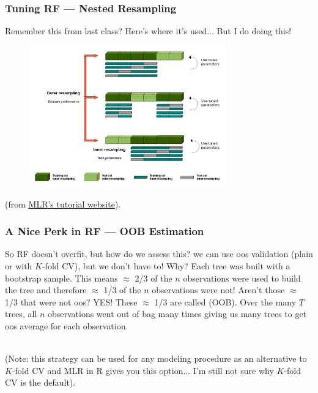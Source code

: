 \documentclass[handout]{beamer}
\begin{document}
\begin{frame}\frametitle{Tuning RF --- Nested Resampling}

Remember this from last class? Here's where it's used... But I do  doing this!

\begin{figure}
\centering
\includegraphics[width=3.36in]{nested_resampling_for_tuning.png}
\end{figure}

(from \href{https://mlr-org.github.io/mlr-tutorial/devel/html/nested_resampling/index.html}{MLR's tutorial website}).
\end{frame}

\begin{frame}\frametitle{A Nice Perk in RF --- OOB Estimation}

So RF doesn't overfit, but how do we assess this? \pause we can use oos validation (plain or with $K$-fold CV), but we don't have to! Why? \pause Each tree was built with a bootstrap sample. This means $\approx$ 2/3 of the $n$ observations were used to build the tree and therefore $\approx$ 1/3 of the $n$ observations were not! Aren't those $\approx$ 1/3 that were not oos? \pause YES! \pause These $\approx$ 1/3 are called  (OOB). Over the many $T$ trees, all $n$ observations went out of bag many times giving us many trees to get oos average for each observation. \\~\\ \pause


\tiny
(Note: this strategy can be used for any modeling procedure as an alternative to $K$-fold CV and MLR in R gives you this option... I'm still not sure why $K$-fold CV is the default). \\~\\ \pause
	
\end{frame}
\end{document}
